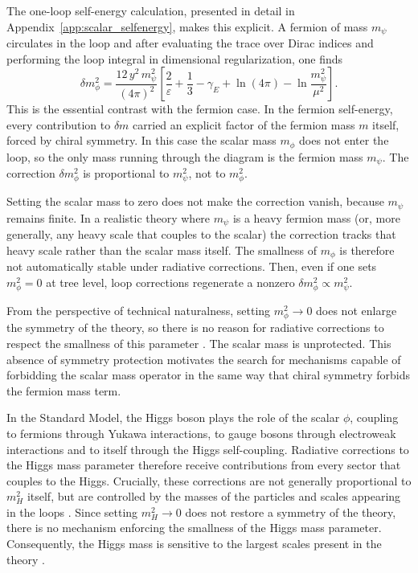 \documentclass[a4paper, 11pt]{article}
\begin{document}
The one-loop self-energy calculation, presented in detail in Appendix~\ref{app:scalar_selfenergy}, makes this explicit. A fermion of mass $m_\psi$ circulates in the loop and after evaluating the trace over Dirac indices and performing the loop integral in dimensional regularization, one finds
\begin{equation*}
  \delta m_\phi^2
  =
  \frac{12\,y^2\,m_\psi^2}{(4\pi)^2}
  \left[
    \frac{2}{\varepsilon}
    + \frac{1}{3}
    - \gamma_E + \ln(4\pi)
    - \ln\!\frac{m_\psi^2}{\mu^2}
  \right].
\end{equation*}
This is the essential contrast with the fermion case. In the fermion self-energy, every contribution to $\delta m$ carried an explicit factor of the fermion mass $m$ itself, forced by chiral symmetry. In this case the scalar mass $m_\phi$ does not enter the loop, so the only mass running through the diagram is the fermion mass $m_\psi$. The correction $\delta m_\phi^2$ is proportional to $m_\psi^2$, not to $m_\phi^2$.

Setting the scalar mass to zero does not make the correction vanish, because $m_\psi$ remains finite. In a realistic theory where $m_\psi$ is a heavy fermion mass (or, more generally, any heavy scale that couples to the scalar) the correction tracks that heavy scale rather than the scalar mass itself. The smallness of $m_\phi$ is therefore not automatically stable under radiative corrections. Then, even if one sets $m_\phi^2 = 0$ at tree level, loop corrections regenerate a nonzero $\delta m_\phi^2 \propto m_\psi^2$.

From the perspective of technical naturalness, setting $m_\phi^2 \to 0$ does not enlarge the symmetry of the theory, so there is no reason for radiative corrections to respect the smallness of this parameter \cite{CraigNaturalness,PeskinHierarchy}. The scalar mass is unprotected. This absence of symmetry protection motivates the search for mechanisms capable of forbidding the scalar mass operator in the same way that chiral symmetry forbids the fermion mass term.

In the Standard Model, the Higgs boson plays the role of the scalar $\phi$, coupling to fermions through Yukawa interactions, to gauge bosons through electroweak interactions and to itself through the Higgs self-coupling. Radiative corrections to the Higgs mass parameter therefore receive contributions from every sector that couples to the Higgs. Crucially, these corrections are not generally proportional to $m_H^2$ itself, but are controlled by the masses of the particles and scales appearing in the loops \cite{PeskinHierarchy}. Since setting $m_H^2\to0$ does not restore a symmetry of the theory, there is no mechanism enforcing the smallness of the Higgs mass parameter. Consequently, the Higgs mass is sensitive to the largest scales present in the theory \cite{PeskinHierarchy}.
\end{document}
